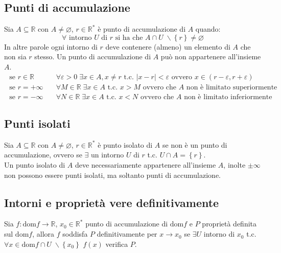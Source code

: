 \documentclass[a4paper]{article}
\newcommand\dom{\text{dom}}
\begin{document}
\subsection{Punti di accumulazione}
Sia \(A \subseteq \mathbb{R}\) con \(A \neq \varnothing\), \(r \in \mathbb{R}^*\) è punto di accumulazione di \(A\) quando:
\[\forall \text{ intorno } U \text{ di } r \text{ si ha che } A \cap U \; \backslash \left\{ r \right\} \neq \varnothing\]
In altre parole ogni intorno di \(r\) deve contenere (almeno) un elemento di \(A\) che non sia \(r\) stesso. Un punto di accumulazione di \(A\) può non appartenere all'insieme \(A\).
\begin{align*}
	\text{ se } r \in \mathbb{R} \quad & \forall \varepsilon > 0 \; \exists x \in A, x \neq r \text{ t.c. } \left| x - r \right| < \varepsilon \text{ ovvero } x \in \left( r - \varepsilon, r + \varepsilon \right) \\
	\text{ se } r = + \infty \quad & \forall M \in \mathbb{R} \; \exists x \in A \text{ t.c. } x > M \text{ ovvero che } A \text{ non è limitato superiormente } \\
	\text{ se } r = - \infty \quad & \forall N \in \mathbb{R} \; \exists x \in A \text{ t.c. } x < N \text{ ovvero che } A \text{ non è limitato inferiormente }
\end{align*}


\subsection{Punti isolati}
Sia \(A \subseteq \mathbb{R}\) con \(A \neq \varnothing\), \(r \in \mathbb{R}^*\) è punto isolato di \(A\) se non è un punto di accumulazione,
ovvero se \(\exists\) un intorno \(U\) di \(r\) t.c. \(U \cap A = \left\{ r \right\}\). \\
Un punto isolato di \(A\) deve necessariamente appartenere all'insieme \(A\), inolte \(\pm \infty\) non possono essere punti isolati, ma soltanto punti di accumulazione.

\newpage


\subsection{Intorni e proprietà vere definitivamente}
Sia \(f: \dom f \to \mathbb{R}\), \(x_0 \in \mathbb{R}^*\) punto di accumulazione di \(\dom f\) e \(P\) proprietà definita sul \(\dom f\),
allora \(f\) soddisfa \(P\) definitivamente per \(x \to x_0\) se \(\exists U\) intorno di \(x_0\) t.c. \(\forall x \in \dom f \cap U \; \backslash \left\{ x_0 \right\}\) \(f(x)\) verifica \(P\).
\end{document}
